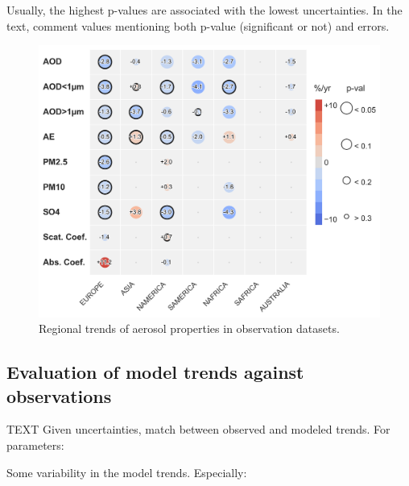 \documentclass[journal abbreviation, manuscript]{copernicus}
\begin{document}
Usually, the highest p-values are associated with the lowest uncertainties.
In the text, comment values mentioning both p-value (significant or not) and errors.

\begin{figure}[t]
 \includegraphics[width=12cm]{../scripts/figs/heatmaps/OBS.png}
 \caption{Regional trends of aerosol properties in observation datasets.}
 \label{obs_trends}
\end{figure}

\subsection{Evaluation of model trends against observations}
TEXT
Given uncertainties, match between observed and modeled trends. For parameters:

Some variability in the model trends. Especially:
\end{document}
